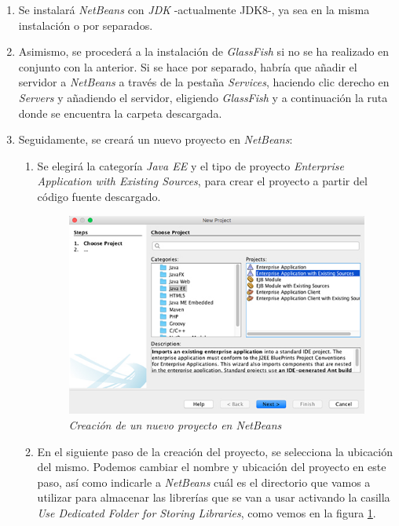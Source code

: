 \begin{enumerate}
\item Se instalará \textit{NetBeans} con \textit{JDK} -actualmente JDK8-, ya sea en la misma instalación o por separados. 

\item Asimismo, se procederá a la instalación de \textit{GlassFish} si no se ha realizado en conjunto con la anterior. Si se hace por separado, habría que añadir el servidor a \textit{NetBeans} a través de la pestaña \textit{Services}, haciendo clic derecho en \textit{Servers} y añadiendo el servidor, eligiendo \textit{GlassFish} y a continuación la ruta donde se encuentra la carpeta descargada.  

\item Seguidamente, se creará un nuevo proyecto en \textit{NetBeans}:

\begin{enumerate}
\item Se elegirá la categoría \textit{Java EE} y el tipo de proyecto \textit{Enterprise Application with Existing Sources}, para crear el proyecto a partir del código fuente descargado. 

\begin{figure}[H]
\centering
  \includegraphics[scale=.60]{img/instalacion/nuevo-proyecto.jpg}
  \caption{\textit{Creación de un nuevo proyecto en NetBeans}}
  \label{fig:nuevo-proyecto}
\end{figure}

\item En el siguiente paso de la creación del proyecto, se selecciona la ubicación del mismo. Podemos cambiar el nombre y ubicación del proyecto en este paso, así como indicarle a \textit{NetBeans} cuál es el directorio que vamos a utilizar para almacenar las librerías que se van a usar activando la casilla \textit{Use Dedicated Folder for Storing Libraries}, como vemos en la figura \ref{fig:nuevo-proyecto}.


\end{enumerate}
\end{enumerate}
